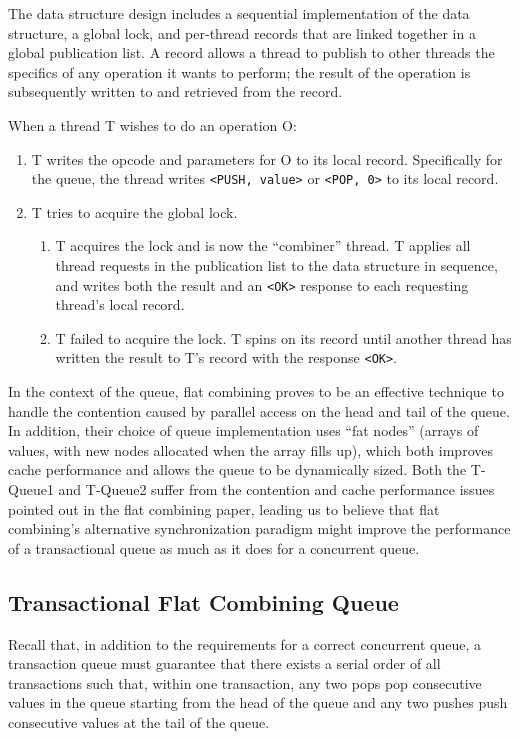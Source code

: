 The data structure design includes a sequential implementation of the data structure, a global lock, and per-thread records that are linked together in a global publication list. A record allows a thread to publish to other threads the specifics of any operation it wants to perform; the result of the operation is subsequently written to and retrieved from the record.

When a thread T wishes to do an operation O:
\begin{enumerate}
    \item T writes the opcode and parameters for O to its local record. Specifically for the queue, the thread writes \texttt{<PUSH, value>} or \texttt{<POP, 0>} to its local record.
   \item T tries to acquire the global lock.
   \begin{enumerate}
        \item T acquires the lock and is now the “combiner” thread. T applies all thread requests in the publication list to the data structure in sequence, and writes both the result and an \texttt{<OK>} response to each requesting thread's local record.
        \item T failed to acquire the lock. T spins on its record until another thread has written the result to T's record with the response \texttt{<OK>}.
    \end{enumerate}
\end{enumerate}

In the context of the queue, flat combining proves to be an effective technique to handle the contention caused by parallel access on the head and tail of the queue. In addition, their choice of queue implementation uses ``fat nodes'' (arrays of values, with new nodes allocated when the array fills up), which both improves cache performance and allows the queue to be dynamically sized. Both the T-Queue1 and T-Queue2 suffer from the contention and cache performance issues pointed out in the flat combining paper, leading us to believe that flat combining's alternative synchronization paradigm might improve the performance of a transactional queue as much as it does for a concurrent queue.

\subsection{Transactional Flat Combining Queue} 
\label{fcqueuet}

Recall that, in addition to the requirements for a correct concurrent queue, a transaction queue must guarantee that there exists a serial order of all transactions such that, within one transaction, any two pops pop consecutive values in the queue starting from the head of the queue and any two pushes push consecutive values at the tail of the queue.

